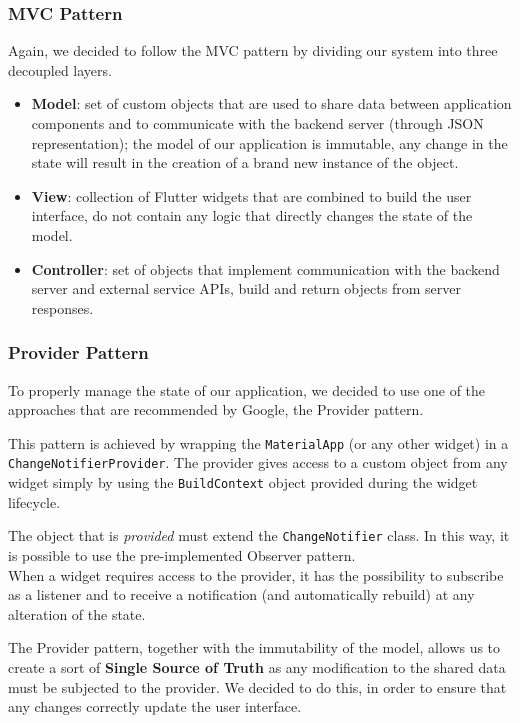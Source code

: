 \subsubsection{MVC Pattern}
Again, we decided to follow the MVC pattern by dividing our system into three decoupled layers.
\begin{itemize}
      \item \textbf{Model}:
            set of custom objects that are used to share data between application components and to communicate with the backend server (through JSON representation);
            the model of our application is immutable, any change in the state will result in the creation of a brand new instance of the object.
      \item \textbf{View}:
            collection of Flutter widgets that are combined to build the user interface, do not contain any logic that directly changes the state of the model.
      \item \textbf{Controller}:
            set of objects that implement communication with the backend server and external service APIs, build and return objects from server responses.
\end{itemize}

\subsubsection{Provider Pattern}
\label{provider}
To properly manage the state of our application, we decided to use one of the approaches that are recommended by Google, the Provider pattern.

This pattern is achieved by wrapping the \texttt{MaterialApp} (or any other widget) in a \texttt{ChangeNotifierProvider}.
The provider gives access to a custom object from any widget simply by using the \texttt{BuildContext} object provided during the widget lifecycle.

The object that is \emph{provided} must extend the \texttt{ChangeNotifier} class. In this way, it is possible to use the pre-implemented Observer pattern.\\
When a widget requires access to the provider, it has the possibility to subscribe as a listener and to receive a notification (and automatically rebuild) at any alteration of the state.

The Provider pattern, together with the immutability of the model, allows us to create a sort of \textbf{Single Source of Truth} as any modification to the shared data must be subjected to the provider.
We decided to do this, in order to ensure that any changes correctly update the user interface.

